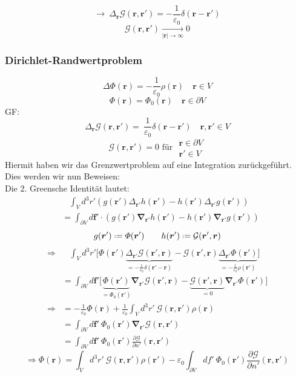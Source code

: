 \documentclass[titlepage,11pt,a4paper,ngerman]{report}
\newcommand*{\defeq}{\mathrel{\vcenter{\baselineskip0.5ex \lineskiplimit0pt \hbox{\scriptsize.}\hbox{\scriptsize.}}}=}
\newcommand{\ub}[1]{\underbrace{#1}}
\newcommand{\gre}{\mathcal{G}}
\newcommand{\prt}[2]{\frac{\partial #1}{\partial #2}}
\newcommand{\pofr}{\Phi(\vec{r})}
\renewcommand{\Phi}{\varPhi}
\renewcommand{\vec}[1]{\boldsymbol{#1}}
\newcommand{\lcom}[1]{\color{MidnightBlue}#1\color{black}}
\renewcommand{\epsilon}{\varepsilon}
\newcommand{\vabla}{\boldsymbol{\nabla}}
\begin{document}
$$\rightarrow\ \Delta_{\vec{r}} \mathcal G(\vec{r}, \vec{r}') = - \frac{1}{\epsilon_0} \delta(\vec{r} - \vec{r}')$$
$$\mathcal G(\vec{r}, \vec{r}') \underset{|\vec{r}| \to \infty} \longrightarrow 0 $$

\subsubsection{Dirichlet-Randwertproblem}

$$\Delta \pofr = -\frac{1}{\epsilon_0} \rho(\vec{r}) \quad \vec{r} \in V$$
$$\pofr = \Phi_0(\vec{r}) \quad \vec{r} \in \partial V$$
GF: $$\Delta_{\vec{r}} \mathcal G(\vec{r}, \vec{r}') = \ \frac{1}{\epsilon_0} \delta(\vec{r} - \vec{r}') \quad \vec{r},\vec{r}' \in V$$
$$\mathcal G(\vec{r}, \vec{r}') = 0 \textrm{ für } \substack{\vec{r} \in \partial V \\ \vec{r}' \in V}$$
\lcom{Hiermit haben wir das Grenzwertproblem auf eine Integration zurückgeführt. Dies werden wir nun Beweisen:}\\[5pt]
Die 2. Greensche Identität lautet: 
\begin{align*}
&\ \ \ \, \int_V d^3 r' \left( g(\vec{r}') \Delta_{\vec{r}'} h(\vec{r}')  - h(\vec{r}') \Delta_{\vec{r}'} g(\vec{r}') \right)\\
&= \int_{\partial V} d\vec{f}' \cdot \left(g(\vec{r}') \vec{\nabla}_{\vec{r}'} h(\vec{r}') - h(\vec{r}') \vec{\nabla} _{\vec{r}'} g(\vec{r}') \right)
\end{align*}
\begin{equation*}
g(\vec{r}') \defeq \Phi(\vec{r}') \qquad h(\vec{r}') \defeq \gre(\vec{r}',\vec{r})
\end{equation*}
\begin{align*}
\Rightarrow & \ \ \ \, \int_V d^3 r' \Bigg[ \Phi(\vec{r}') \ub{\Delta_{\vec{r}'} \gre(\vec{r}',\vec{r})}_{= -\frac{1}{\epsilon_0} \delta(\vec{r}' - \vec{r})} - \gre(\vec{r}',\vec{r}) \ub{\Delta_{\vec{r}'} \Phi(\vec{r}')}_{= - \frac{1}{\epsilon_0} \rho(\vec{r}')} \Bigg]\\
&= \int_{\partial V} d\vec{f}' \Bigg[ \ub{\Phi(\vec{r}')}_{= \Phi_0(\vec{r}')} \vec{\nabla}_{\vec{r}'} \gre(\vec{r}',\vec{r}) - \ub{\gre(\vec{r}',\vec{r})}_{= 0} \vec{\nabla}_{\vec{r}'} \Phi(\vec{r}') \Bigg]\\ %
\Rightarrow &= - \frac{1}{\epsilon_0} \pofr + \frac{1}{\epsilon_0} \int_V d^3 r'\ \mathcal G(\vec{r}, \vec{r}') \rho(\vec{r})\\
&= \int_{\partial V} d \vec{f}'\ \Phi_0 (\vec{r}') \vabla_{\vec{r}'} \mathcal G(\vec{r}, \vec{r}')\\
&= \int_{\partial V} d \vec{f}'\ \Phi_0 (\vec{r}') \prt{\mathcal G}{n'}(\vec{r}, \vec{r}')
\end{align*}
\begin{equation*}
\Rightarrow \pofr = \int_V d^3r'\ \mathcal G(\vec{r}, \vec{r}') \rho(\vec{r}') - \epsilon_0 \int_{\partial V} df'\ \Phi_0 (\vec{r}') \prt{\mathcal G}{n'}(\vec{r}, \vec{r}')
\end{equation*}
\end{document}
